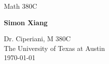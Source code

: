 \documentclass{article}
\begin{document}
\begin{titlepage}
    \begin{center}
        \vspace*{1cm}
 
        \Huge
 
        \vspace{0.5cm}
        \LARGE
        Math 380C       

        \vspace{1.5cm}
 
        \textbf{Simon Xiang}
 
        \vfill
  
        \vspace{0.8cm}
 
        \Large
    	Dr. Ciperiani, M 380C\\
        The University of Texas at Austin\\
        \today
 
    \end{center}
\end{titlepage}
    
\end{document}
